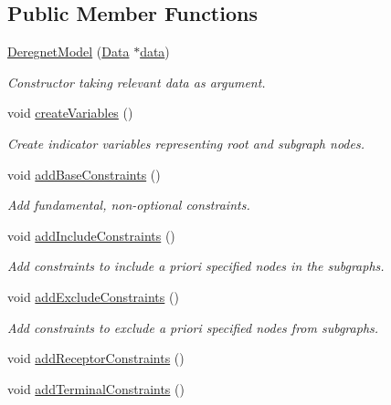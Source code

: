 \subsection*{Public Member Functions}
\begin{DoxyCompactItemize}
\item 
\hyperlink{classderegnet_1_1DeregnetModel_a218830114b0bd75965152c5c63a5f4d6}{Deregnet\+Model} (\hyperlink{avgdrgnt_8cpp_a1d1235306db276e9b36acba1db1509e8}{Data} $\ast$\hyperlink{classderegnet_1_1DeregnetModel_ad5399761cf6293a702f3800bda4806d1}{data})
\begin{DoxyCompactList}\small\item\em Constructor taking relevant data as argument. \end{DoxyCompactList}\item 
void \hyperlink{classderegnet_1_1DeregnetModel_ae4dd4e4ae3e796c03d4390eeac1e0a96}{create\+Variables} ()
\begin{DoxyCompactList}\small\item\em Create indicator variables representing root and subgraph nodes. \end{DoxyCompactList}\item 
void \hyperlink{classderegnet_1_1DeregnetModel_ae246d2286429b83b32e727da987a5817}{add\+Base\+Constraints} ()
\begin{DoxyCompactList}\small\item\em Add fundamental, non-\/optional constraints. \end{DoxyCompactList}\item 
void \hyperlink{classderegnet_1_1DeregnetModel_a6970e42a055fa0dc871d6991ac0feab4}{add\+Include\+Constraints} ()
\begin{DoxyCompactList}\small\item\em Add constraints to include a priori specified nodes in the subgraphs. \end{DoxyCompactList}\item 
void \hyperlink{classderegnet_1_1DeregnetModel_a3b47185dcea73dbcad67d115c55ae762}{add\+Exclude\+Constraints} ()
\begin{DoxyCompactList}\small\item\em Add constraints to exclude a priori specified nodes from subgraphs. \end{DoxyCompactList}\item 
void \hyperlink{classderegnet_1_1DeregnetModel_a6d8c05a79c11aefcf05bcdbf9f17aacb}{add\+Receptor\+Constraints} ()
\item 
void \hyperlink{classderegnet_1_1DeregnetModel_aee4a0d40a616c0e6e8787dcca08637aa}{add\+Terminal\+Constraints} ()

\end{DoxyCompactItemize}
